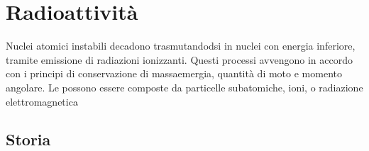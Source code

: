 \documentclass[letterpaper,10pt,italian]{jupyterBook}
\begin{document}
\chapter{Radioattività}
\label{\detokenize{ch/modern/intro-radioactivity:radioattivita}}\label{\detokenize{ch/modern/intro-radioactivity:physics-hs-modern-radioactivity}}\label{\detokenize{ch/modern/intro-radioactivity::doc}}
\sphinxAtStartPar
Nuclei atomici instabili decadono trasmutandodsi in nuclei con energia inferiore, tramite emissione di radiazioni ionizzanti.
Questi processi avvengono in accordo con i principi di conservazione di massa\sphinxhyphen{}emergia, quantità di moto e momento angolare.
Le possono essere composte da particelle subatomiche, ioni, o radiazione elettromagnetica  


\section{Storia}
\label{\detokenize{ch/modern/intro-radioactivity:storia}}
\end{document}
